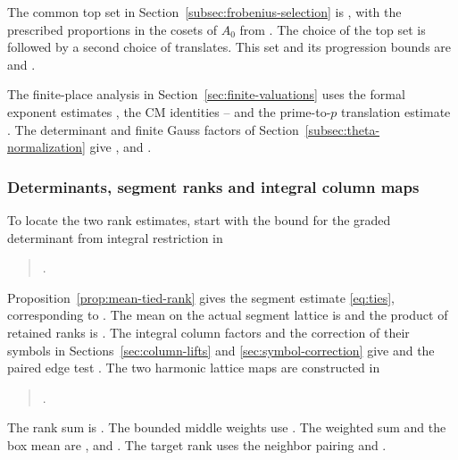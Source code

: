 The common top set in Section~\ref{subsec:frobenius-selection}
is , with the prescribed proportions in the cosets of \(A_0\) from
. The choice of the top set is followed by a second choice of translates. This set and
its progression bounds are  and .
\cite{release}

The finite-place analysis in Section~\ref{sec:finite-valuations}
uses the formal exponent estimates , the CM
identities -- and the prime-to-\(p\)
translation estimate . The determinant and
finite Gauss factors of Section~\ref{subsec:theta-normalization}
give ,  and
. \cite{release}

\subsubsection{Determinants, segment ranks and integral column maps}

To locate the two rank estimates, start with the bound for the graded determinant from
integral restriction in
\begin{quote}
.
\end{quote}
Proposition~\ref{prop:mean-tied-rank} gives the segment estimate \eqref{eq:ties}, corresponding to .
The mean on the actual segment lattice is  and the product of retained ranks is .
The integral column factors and the correction of their symbols
in Sections~\ref{sec:column-lifts} and \ref{sec:symbol-correction}
give  and the paired edge test
. The two harmonic
lattice maps are constructed in
\begin{quote}
.
\end{quote}
{\raggedright
The rank sum is .
The bounded middle weights use .
The weighted sum and the box mean are ,
 and .
The target rank uses the neighbor pairing and
. \cite{release}\par}

